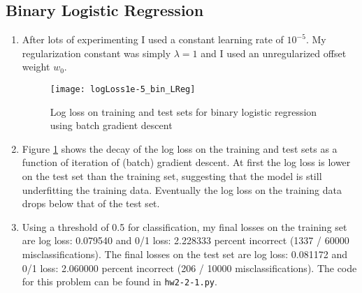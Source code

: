 \documentclass{article}
\begin{document}
\subsection{Binary Logistic Regression}
\begin{enumerate}
	\item After lots of experimenting I used a constant learning rate of $10^{-5}$. My regularization constant was simply $\lambda = 1$ and I used an unregularized offset weight $w_0$.

	\begin{figure}
        \centering
        \texttt{[image: logLoss1e-5\_bin\_LReg]}
        \caption{Log loss on training and test sets for binary logistic regression using batch gradient descent} 
        \label{fig:2.1}
    \end{figure}

	\item Figure \ref{fig:2.1} shows the decay of the log loss on the training and test sets as a function of iteration of (batch) gradient descent. At first the log loss is lower on the test set than the training set, suggesting that the model is still underfitting the training data. Eventually the log loss on the training data drops below that of the test set.
	\item Using a threshold of 0.5 for classification, my final losses on the training set are log loss: 0.079540 and 0/1 loss: 2.228333 percent incorrect (1337 / 60000 misclassifications). The final losses on the test set are log loss: 0.081172 and 0/1 loss: 2.060000 percent incorrect (206 / 10000 misclassifications). The code for this problem can be found in \texttt{hw2-2-1.py}.
\end{enumerate}
\end{document}
